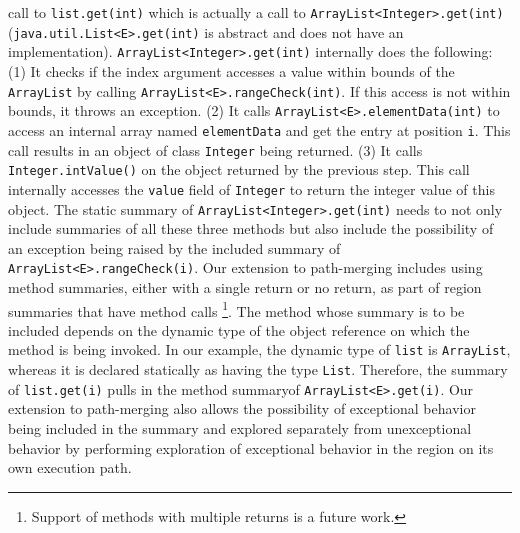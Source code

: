 call to {\tt list.get(int)} which is actually a call to {\tt ArrayList<Integer>.get(int)} ({\tt java.util.List<E>.get(int)} is abstract and does not have an implementation).
%
{\tt ArrayList<Integer>.get(int)} internally does the following:
%
(1) It checks if the index argument accesses a value within bounds of the {\tt ArrayList} by calling {\tt ArrayList<E>.rangeCheck(int)}. If this access is not within bounds, it throws an exception.
%
(2) It calls {\tt ArrayList<E>.elementData(int)} to access an internal array named {\tt elementData} and get the entry at position {\tt i}. This call results in an object of class {\tt Integer} being returned.
%
(3) It calls {\tt Integer.intValue()} on the object returned by the previous step. This call internally accesses the {\tt value} field of {\tt Integer} to return the integer value of this object.
%
The static summary of {\tt ArrayList<Integer>.get(int)} needs to not only include summaries of all these three methods but
also include the possibility of an exception being raised by the included summary of {\tt ArrayList<E>.rangeCheck(i)}.
%
Our extension to path-merging includes using method summaries, either with a single return or no return, as part of region summaries that have method calls \footnote{Support of methods with multiple returns is a future work.}.
%
The method whose summary is to be included depends on the dynamic type of the object reference on which the method is being invoked.
%
In our example, the dynamic type of {\tt list} is {\tt ArrayList}, whereas it is declared statically as having the type {\tt List}.
%
Therefore, the summary of {\tt list.get(i)} pulls in the method summaryof {\tt ArrayList<E>.get(i)}.
%
Our extension to path-merging also allows the possibility of exceptional behavior being included in the summary and
explored separately from unexceptional behavior by performing exploration of exceptional behavior in the region on its
own execution path.